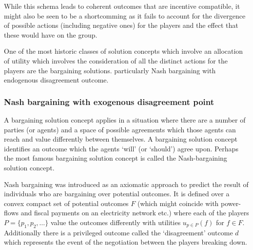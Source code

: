 While this schema leads to coherent outcomes that are incentive compatible, it might also be seen to be a shortcomming as it fails to account for the divergence of possible actions (including negative ones) for the players and the effect that these would have on the group.

One of the most historic classes of solution concepts which involve an allocation of utility which involves the consideration of all the distinct actions for the players are the bargaining solutions.
particularly Nash bargaining with endogenous disagreement outcome.

\subsubsection{Nash bargaining with exogenous disagreement point}\label{sec:nash_bargaining_exogenous}

A bargaining solution concept applies in a situation where there are a number of parties (or agents) and a space of possible agreements which those agents can reach and value differently between themselves.
A bargaining solution concept identifies an outcome which the agents `will' (or `should') agree upon.
Perhaps the most famous bargaining solution concept is called the Nash-bargaining solution concept.

Nash bargaining was introduced \cite{nash1} as an axiomatic approach to predict the result of individuals who are bargaining over potential outcomes.
It is defined over a convex compact set of potential outcomes $F$ (which might coincide with power-flows and fiscal payments on an electricity network etc.) 
where each of the players $P=\{p_1,p_2,\dots\}$ value the outcomes differently with utilities $u_{p\in P}(f)$ for $f\in F$.
Additionally there is a privileged outcome called the `disagreement' outcome $d$ which represents the event of the negotiation between the players breaking down.

